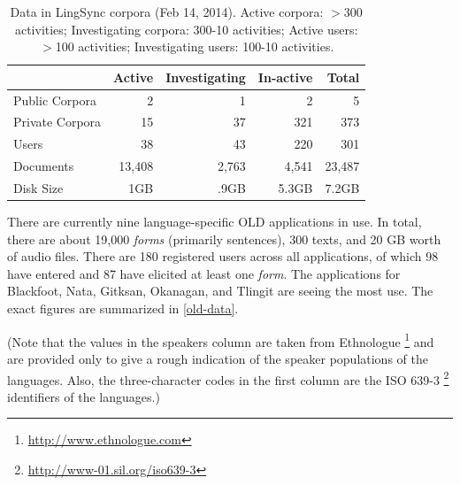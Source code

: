 \documentclass[11pt]{article}
\begin{document}
\begin{table}[h]
\begin{center}
\scriptsize
\begin{tabular}{lrrrr}
      \toprule
                     ~ &  Active & Investigating & In-active & Total\\
      \midrule
      Public Corpora  &       2 &   1 &   2 & 5 \\ 
      Private Corpora &      15 &  37 & 321 & 373\\ 
      Users           &      38 &  43 & 220 & 301 \\
      Documents & 13,408 & 2,763 & 4,541 &23,487\\
      Disk Size & 1GB & .9GB & 5.3GB& 7.2GB\\
      
      \bottomrule

\end{tabular}
\caption{Data in LingSync corpora (Feb 14, 2014).
Active corpora: $>$300 activities; Investigating corpora: 300-10 activities; Active users: $>$100 activities; Investigating users: 100-10 activities.}
\label{lingsync-data}
 \end{center}
 \normalsize
\end{table}




There are currently nine language-specific OLD applications in use. In total,
there are about 19,000 \emph{forms} (primarily sentences), 300 texts, and 20 GB worth
of audio files.  There are 180 registered users across all applications, of
which 98 have entered and 87 have elicited at least one \emph{form}. The applications
for Blackfoot, Nata, Gitksan, Okanagan, and Tlingit are seeing the most use. The
exact figures are summarized in \autoref{old-data}.

(Note that the values in the speakers column are taken from Ethnologue%
\footnote{\url{http://www.ethnologue.com}} %
and are provided only to give a rough indication of the speaker populations of
the languages. Also, the three-character codes in the first column are the ISO
639-3%
\footnote{\url{http://www-01.sil.org/iso639-3}} %
identifiers of the languages.)
\end{document}
